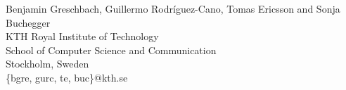 


%


\def\thanks#1{\footnotemark
    \protected@xdef\@thanks{\@thanks
        \protect\footnotetext[\the\c@footnote]{#1}}%
}

\begin{center}
Benjamin Greschbach, Guillermo Rodr\'{i}guez-Cano, Tomas Ericsson and Sonja Buchegger\\[2em]

KTH Royal Institute of Technology\\
School of Computer Science and Communication\\
Stockholm, Sweden\\
\{bgre, gurc, te, buc\}@kth.se
\end{center}

